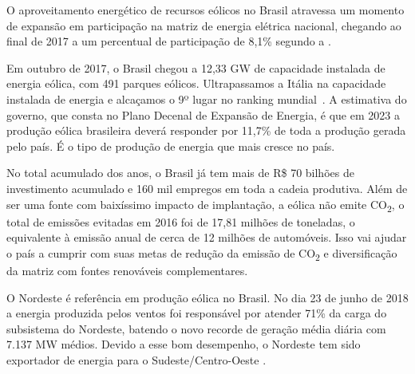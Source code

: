 
\label{Cap:Introducao}

O aproveitamento energético de recursos eólicos no Brasil atravessa um momento de expansão em participação na matriz de energia elétrica nacional, chegando ao final de 2017 a um percentual de participação de 8,1\% segundo a .

Em outubro de 2017, o Brasil chegou a 12,33 GW de capacidade instalada de energia eólica, com 491 parques eólicos. Ultrapassamos a Itália na capacidade instalada de energia e alcaçamos o 9º lugar no ranking mundial~\cite{abeeolica-boletim-mensal-geracao-out-2017}. A estimativa do governo, que consta no Plano Decenal de Expansão de Energia, é que em 2023 a produção eólica brasileira deverá responder por 11,7\% de toda a produção gerada pelo país. É o tipo de produção de energia que mais cresce no país.

No total acumulado dos anos, o Brasil já tem mais de R\$ 70 bilhões de investimento acumulado e 160 mil empregos em toda a cadeia produtiva. Além de ser uma fonte com baixíssimo impacto de implantação, a eólica não emite CO\textsubscript{2}, o total de emissões evitadas em 2016 foi de 17,81 milhões de toneladas, o equivalente à emissão anual de cerca de 12 milhões de automóveis. Isso vai ajudar o país a cumprir com suas metas de redução da emissão de CO\textsubscript{2} e diversificação da matriz com fontes renováveis complementares.

O Nordeste é referência em produção eólica no Brasil. No dia 23 de junho de 2018 a energia produzida pelos ventos foi responsável por atender 71\% da carga do subsistema do Nordeste, batendo o novo recorde de geração média diária com 7.137 MW médios. Devido a esse bom desempenho, o Nordeste tem sido exportador de energia para o Sudeste/Centro-Oeste \cite{ons-recorde-geracao}.

